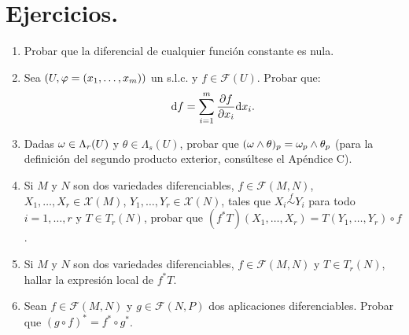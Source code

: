 \documentclass[cursovd_portada.tex]{subfiles}
\begin{document}
\section{Ejercicios.}
\begin{enumerate}
\item Probar que la diferencial de cualquier funci\'{o}n constante
es nula. \item Sea $(U,\varphi=(x_1,\dots, x_m))$ un s.l.c. y
$f\in\mathcal{F}(U)$. Probar que:
$${\rm d} f=\sum_{i=1}^m\displaystyle{\frac{\partial f}{\partial x_i}}{\rm d} x_i.$$
\item Dadas $\omega\in\Lambda_r(U)$ y $\theta\in\Lambda_s(U)$, probar
que $(\omega\wedge\theta)_p=\omega_p\wedge\theta_p$ (para la
definici\'on del segundo producto exterior, cons\'ultese el
Ap\'endice C). \item Si $M$ y $N$ son dos variedades
diferenciables, $f\in\mathcal{F}(M,N)$, $X_1,\dots
,X_r\in\mathcal{X}(M)$, $Y_1,\dots ,Y_r\in\mathcal{X}(N)$, tales
que $X_i\stackrel{f}\sim Y_i$ para todo $i=1,\dots ,r$ y $T\in
T_r(N)$, probar que $(f^*T)(X_1,\dots ,X_r)=T(Y_1,\dots ,Y_r)\circ
f$. \item Si $M$ y $N$ son dos variedades diferenciables,
$f\in\mathcal{F}(M,N)$ y $T\in T_r(N)$, hallar la expresi\'{o}n
local de $f^*T$. \item Sean $f\in\mathcal{F}(M,N)$ y
$g\in\mathcal{F}(N,P)$ dos aplicaciones diferenciables. Probar que
$(g\circ f)^*=f^*\circ g^*$.
\end{enumerate}
\end{document}
